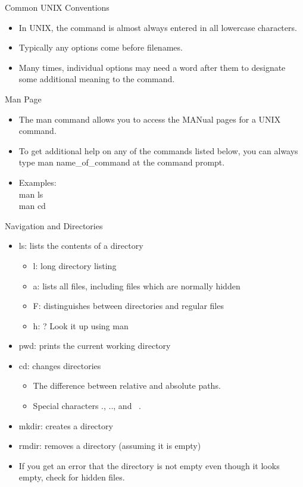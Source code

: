 \documentclass{beamer}
\begin{document}
\begin{frame}{Common UNIX Conventions}
\begin{itemize}
\item In UNIX, the command is almost always entered in all lowercase characters. 
\item Typically any options come before filenames.
\item Many times, individual options may need a word after them to designate some additional meaning to the command.
\end{itemize}
\end{frame}

\begin{frame}{Man Page}
\begin{itemize}
\item The man command allows you to access the MANual pages for a UNIX command.
\item To get additional help on any of the commands listed below, you can always type man name\_of\_command at the command prompt.
\item Examples:\\
man ls \\
man cd
\end{itemize}
\end{frame}


\begin{frame}{Navigation and Directories}
\begin{itemize}
\item ls: lists the contents of a directory
\begin{itemize}
\item l: long directory listing
\item a: lists all files, including files which are normally hidden
\item F: distinguishes between directories and regular files
\item h: ?  Look it up using man
\end{itemize}
\item pwd: prints the current working directory
\item cd: changes directories
\begin{itemize}
\item The difference between relative and absolute paths.
\item Special characters ., .., and ~.
\end{itemize}
\item mkdir: creates a directory
\item rmdir: removes a directory (assuming it is empty)
\item If you get an error that the directory is not empty even though it looks empty, check for hidden files.
\end{itemize}
\end{frame}
\end{document}
